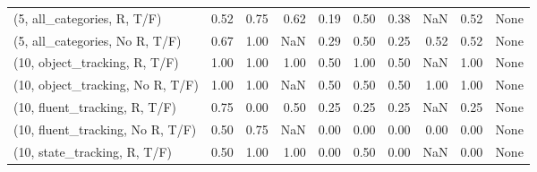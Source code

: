 \begin{table*}[h!]
\begin{adjustbox}{width=2\columnwidth,center}
\begin{tabular}{lrrr|rrr|rrr}
(5, all\_categories, R, T/F)          &                      0.52 &                  0.75 &                      0.62 &                          0.19 &                      0.50 &                          0.38 &                                    NaN &                               0.52 &                                  None \\
(5, all\_categories, No R, T/F)       &                      0.67 &                  1.00 &                       NaN &                          0.29 &                      0.50 &                          0.25 &                                   0.52 &                               0.52 &                                  None \\



\midrule
(10, object\_tracking, R, T/F)         &                      1.00 &                  1.00 &                      1.00 &                          0.50 &                      1.00 &                          0.50 &                                    NaN &                               1.00 &                                  None \\
(10, object\_tracking, No R, T/F)      &                      1.00 &                  1.00 &                       NaN &                          0.50 &                      0.50 &                          0.50 &                                   1.00 &                               1.00 &                                  None \\
(10, fluent\_tracking, R, T/F)         &                      0.75 &                  0.00 &                      0.50 &                          0.25 &                      0.25 &                          0.25 &                                    NaN &                               0.25 &                                  None \\
(10, fluent\_tracking, No R, T/F)      &                      0.50 &                  0.75 &                       NaN &                          0.00 &                      0.00 &                          0.00 &                                   0.00 &                               0.00 &                                  None \\
(10, state\_tracking, R, T/F)          &                      0.50 &                  1.00 &                      1.00 &                          0.00 &                      0.50 &                          0.00 &                                    NaN &                               0.00 &                                  None \\

\end{tabular}
\end{adjustbox}
\end{table*}
